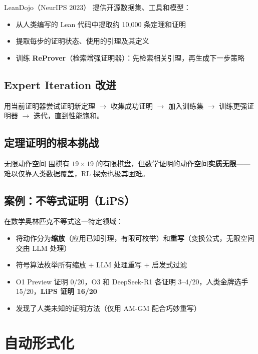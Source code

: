 \documentclass[a4paper]{article}
\begin{document}
\begin{importantbox}{LeanDojo（NeurIPS 2023）}
提供开源数据集、工具和模型：
\begin{itemize}
    \item 从人类编写的 Lean 代码中提取约 10,000 条定理和证明
    \item 提取每步的证明状态、使用的引理及其定义
    \item 训练 \textbf{ReProver}（检索增强证明器）：先检索相关引理，再生成下一步策略
\end{itemize}
\end{importantbox}

\subsection{Expert Iteration 改进}

用当前证明器尝试证明新定理 $\to$ 收集成功证明 $\to$ 加入训练集 $\to$ 训练更强证明器 $\to$ 迭代，直到性能饱和。

\subsection{定理证明的根本挑战}

\begin{warningbox}{无限动作空间}
围棋有 $19\times19$ 的有限棋盘，但数学证明的动作空间\textbf{实质无限}——难以仅靠人类数据覆盖，RL 探索也极其困难。
\end{warningbox}

\subsection{案例：不等式证明（LiPS）}

在数学奥林匹克不等式这一特定领域：
\begin{itemize}
    \item 将动作分为\textbf{缩放}（应用已知引理，有限可枚举）和\textbf{重写}（变换公式，无限空间交由 LLM 处理）
    \item 符号算法枚举所有缩放 + LLM 处理重写 + 启发式过滤
    \item O1 Preview 证明 0/20，O3 和 DeepSeek-R1 各证明 3--4/20，人类金牌选手 15/20，\textbf{LiPS 证明 16/20}
    \item 发现了人类未知的证明方法（仅用 AM-GM 配合巧妙重写）
\end{itemize}

\section{自动形式化}
\end{document}

